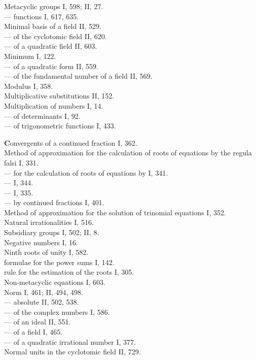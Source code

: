 Metacyclic groups I, 598; II, 27.\\
--- functions I, 617, 635.\\
Minimal basis of a field II, 529.\\
--- of the cyclotomic field II, 620.\\
--- of a quadratic field II, 603.\\
Minimum I, 122.\\
--- of a quadratic form II, 559.\\
--- of the fundamental number of a field II, 569.\\
Modulus I, 358.\\
Multiplicative substitutions II, 152.\\
Multiplication of numbers I, 14.\\
--- of determinants I, 92.\\
--- of trigonometric functions I, 433.

\medskip
\noindent
\textbf{C}onvergents of a continued fraction I, 362.\\
Method of approximation for the calculation of roots of equations by the regula falsi I, 331.\\
--- for the calculation of roots of equations by  I, 341.\\ %
---  I, 344.\\
---  I, 335.\\
--- by continued fractions I, 401.\\
Method of approximation for the solution of trinomial equations I, 352.\\
Natural irrationalities I, 516.\\
Subsidiary groups I, 502; II, 8.\\
Negative numbers I, 16.\\
Ninth roots of unity I, 582.\\
 formulae for the power sums I, 142.\\
 rule for the estimation of the roots I, 305.\\
Non-metacyclic equations I, 603.\\
Norm I, 461; II, 494, 498.\\
--- absolute II, 502, 538.\\
--- of the  complex numbers I, 586.\\
--- of an ideal II, 551.\\
--- of a field I, 465.\\
--- of a quadratic irrational number I, 377.\\
Normal units in the cyclotomic field II, 729.
